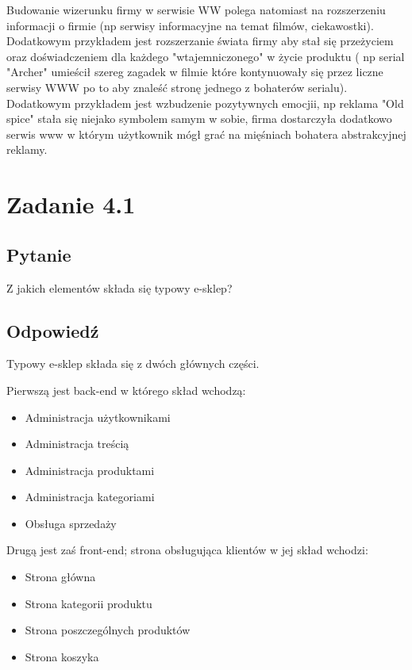 \documentclass[paper=a4, fontsize=11pt]{scrartcl} %
\numberwithin{equation}{section} %
\numberwithin{figure}{section} %
\numberwithin{table}{section} %
\begin{document}
Budowanie wizerunku firmy w serwisie WW polega natomiast na rozszerzeniu informacji o firmie (np serwisy informacyjne
na temat filmów, ciekawostki). Dodatkowym przykładem jest rozszerzanie świata firmy aby stał się przeżyciem oraz
doświadczeniem dla każdego "wtajemniczonego" w życie produktu ( np serial "Archer" umieścił szereg zagadek w filmie które
kontynuowały się przez liczne serwisy WWW po to aby znaleść stronę jednego z bohaterów serialu). Dodatkowym przykładem jest
wzbudzenie pozytywnych emocjii, np reklama "Old spice" stała się niejako symbolem samym w sobie, firma dostarczyła
dodatkowo serwis www w którym użytkownik mógł grać na mięśniach bohatera abstrakcyjnej reklamy.

\section{Zadanie 4.1}

\subsection {Pytanie}

Z jakich elementów składa się typowy e-sklep?

\subsection {Odpowiedź}

Typowy e-sklep składa się z dwóch głównych części.

Pierwszą jest back-end w którego skład wchodzą:

\begin{itemize}
  \item Administracja użytkownikami
  \item Administracja treścią 
  \item Administracja produktami 
  \item Administracja kategoriami 
  \item Obsługa sprzedaży 
\end{itemize}

Drugą jest zaś front-end; strona obsługująca klientów
w jej skład wchodzi:

\begin{itemize}
  \item Strona główna
  \item Strona kategorii produktu
  \item Strona poszczególnych produktów
  \item Strona koszyka
\end{itemize}
\end{document}

